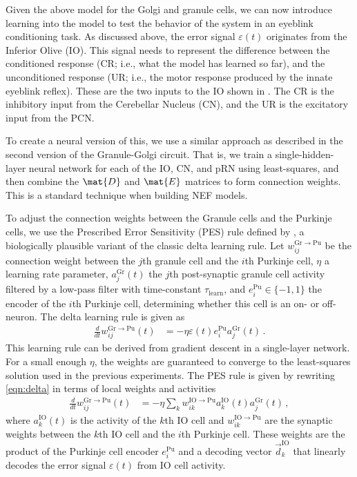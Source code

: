 Given the above model for the Golgi and granule cells, we can now introduce learning into the model to test the behavior of the system in an eyeblink conditioning task.
As discussed above, the error signal $\varepsilon(t)$ originates from the Inferior Olive (IO).
This signal needs to represent the difference between the conditioned response (CR; i.e., what the model has learned so far), and the unconditioned response (UR; i.e., the motor response produced by the innate eyeblink reflex).
These are the two inputs to the IO shown in .
The CR is the inhibitory input from the Cerebellar Nucleus (CN), and the UR is the excitatory input from the PCN.  

To create a neural version of this, we use a similar approach as described in the second version of the Granule-Golgi circuit.
That is, we train a single-hidden-layer neural network for each of the IO, CN, and pRN using least-squares, and then combine the $\mat{D}$ and $\mat{E}$ matrices to form connection weights.
This is a standard technique when building NEF models.

To adjust the connection weights between the Granule cells and the Purkinje cells, we use the Prescribed Error Sensitivity (PES) rule defined by \citet{macneil2011finetuning}, a biologically plausible variant of the classic delta learning rule.
Let $w^{\mathrm{Gr}\to\mathrm{Pu}}_{ij}$ be the connection weight between the $j$th granule cell and the $i$th Purkinje cell, $\eta$ a learning rate parameter, $a^\mathrm{Gr}_j(t)$ the $j$th post-synaptic granule cell activity filtered by a low-pass filter with time-constant $\tau_\mathrm{learn}$, and $e^\mathrm{Pu}_i \in \{-1, 1\}$ the encoder of the $i$th Purkinje cell, determining whether this cell is an on- or off-neuron.
The delta learning rule is given as
\begin{align}
	\frac{d}{dt} w^{\mathrm{Gr}\to\mathrm{Pu}}_{ij}(t) &= -\eta \varepsilon(t) e^\mathrm{Pu}_i a^\mathrm{Gr}_j(t) \,.
	\label{eqn:delta}
\end{align}
This learning rule can be derived from gradient descent in a single-layer network.
For a small enough $\eta$, the weights are guaranteed to converge to the least-squares solution used in the previous experiments.
The PES rule is given by rewriting \cref{eqn:delta} in terms of local weights and activities
\begin{align*}
	\frac{d}{dt} w^{\mathrm{Gr}\to\mathrm{Pu}}_{ij}(t) &= -\eta \sum_{k} w^{\mathrm{IO}\to\mathrm{Pu}}_{ik} a^\mathrm{IO}_k(t) a^\mathrm{Gr}_j(t) \,,
\end{align*}
where $a^\mathrm{IO}_k(t)$ is the activity of the $k$th IO cell and $w^{\mathrm{IO}\to\mathrm{Pu}}_{ik}$ are the synaptic weights between the $k$th IO cell and the $i$th Purkinje cell. These weights are the product of the Purkinje cell encoder $e_i^\mathrm{Pu}$ and a decoding vector $\vec d_k^\mathrm{IO}$ that linearly decodes the error signal $\varepsilon(t)$ from IO cell activity.

